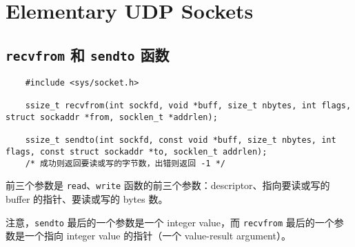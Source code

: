 \section{Elementary UDP Sockets}

  \subsection{\texttt{recvfrom} 和 \texttt{sendto} 函数}

    \begin{verbatim}
    #include <sys/socket.h>

    ssize_t recvfrom(int sockfd, void *buff, size_t nbytes, int flags, struct sockaddr *from, socklen_t *addrlen);
    
    ssize_t sendto(int sockfd, const void *buff, size_t nbytes, int flags, const struct sockaddr *to, socklen_t addrlen);
    /* 成功则返回要读或写的字节数，出错则返回 -1 */
    \end{verbatim}

    前三个参数是 \texttt{read}、\texttt{write} 函数的前三个参数：descriptor、指向要读或写的 buffer 的指针、要读或写的 bytes 数。

    注意，\texttt{sendto} 最后的一个参数是一个 integer value，而 \texttt{recvfrom} 最后的一个参数是一个指向 integer value 的指针（一个 value-result argument）。